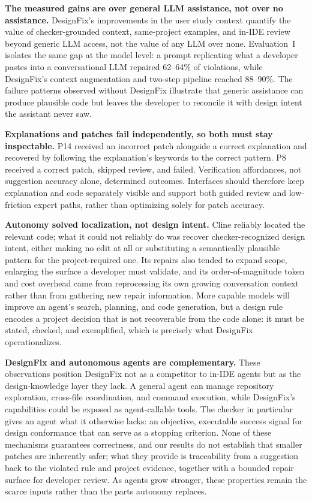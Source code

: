 \textbf{The measured gains are over general LLM assistance, not over no
assistance.} DesignFix's
improvements in the user study context quantify the value of checker-grounded context,
same-project examples, and in-IDE review beyond generic LLM access, not
the value of any LLM over none. Evaluation~I isolates the same gap at
the model level: a prompt replicating what a developer pastes into a
conversational LLM repaired 62--64\% of violations, while DesignFix's
context augmentation and two-step pipeline reached 88--90\%. The failure patterns observed without DesignFix illustrate that generic assistance can produce plausible code but
leaves the developer to reconcile it with design intent the assistant
never saw.

\textbf{Explanations and patches fail independently, so both must stay
inspectable.} P14 received an incorrect patch alongside a correct
explanation and recovered by following the explanation's keywords to
the correct pattern. P8 received a correct patch, skipped review, and
failed. Verification affordances, not suggestion accuracy alone,
determined outcomes. Interfaces should therefore keep
explanation and code separately visible and support both guided review
and low-friction expert paths, rather than optimizing solely for patch
accuracy.

\textbf{Autonomy solved localization, not design intent.} Cline
reliably located the relevant code; what it could not reliably do was
recover checker-recognized design intent, either making no edit at all
or substituting a semantically plausible pattern for the
project-required one. Its repairs also tended to expand scope, enlarging the
surface a developer must validate, and its order-of-magnitude token and
cost overhead came from reprocessing its own growing conversation
context rather than from gathering new repair information. More capable
models will improve an agent's search, planning, and code generation,
but a design rule encodes a project decision that is not recoverable
from the code alone: it must be stated, checked, and exemplified, which
is precisely what DesignFix operationalizes.


\textbf{DesignFix and autonomous agents are complementary.} These
observations position DesignFix not as a competitor to in-IDE agents
but as the design-knowledge layer they lack. A general agent can manage
repository exploration, cross-file coordination, and command execution,
while DesignFix's capabilities could be exposed as agent-callable tools. The checker in particular
gives an agent what it otherwise lacks: an objective, executable
success signal for design conformance that can serve as a stopping
criterion. None of these mechanisms guarantees correctness, and our
results do not establish that smaller patches are inherently safer;
what they provide is traceability from a suggestion back to the
violated rule and project evidence, together with a bounded repair
surface for developer review. As agents grow stronger, these properties
remain the scarce inputs rather than the parts autonomy
replaces.


